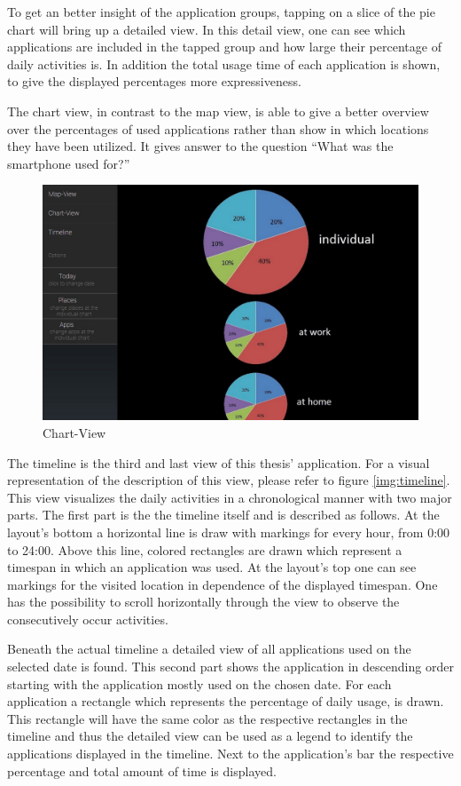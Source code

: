 To  get an better insight of the application groups, tapping on a slice of the pie chart will bring up a detailed view. In this detail view, one can see which applications are included in the tapped group and how large their percentage of daily activities is. In addition the total usage time of each application is shown, to give the displayed percentages more expressiveness.

The chart view, in contrast to the map view, is able to give a better overview over the percentages of used applications rather than show in which locations they have been utilized. It gives answer to the question ``What was the smartphone used for?''
\begin{figure}[h]
	\caption{Chart-View}
	\label{img:chartview}
	\includegraphics[width=\textwidth]{images/Design/2_ChartView.jpg}
\end{figure}

The  timeline is the third and last view of this thesis' application. For a visual representation of the description of this view, please refer to figure \ref{img:timeline}. This view visualizes the daily activities in a chronological manner with two major parts. The first part is the the timeline itself and is described as follows. At the layout's bottom a horizontal line is draw with markings for every hour, from 0:00 to 24:00. Above this line, colored rectangles are drawn which represent a timespan in which an application was used. At the layout's top one can see markings for the visited location in dependence of the displayed timespan. One has the possibility to scroll horizontally through the view to observe the consecutively occur activities.

Beneath  the actual timeline a detailed view of all applications used on the selected date is found. This second part shows the application in descending order starting with the application mostly used on the chosen date. For each application a rectangle which represents the percentage of daily usage, is drawn. This rectangle will have the same color as the respective rectangles in the timeline and thus the detailed view can be used as a legend to identify the applications displayed in the timeline. Next to the application's bar the respective percentage and total amount of time is displayed.

